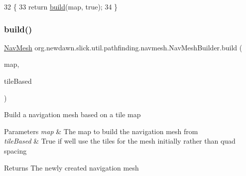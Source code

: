 \begin{DoxyCode}
32                                            \{
33         \textcolor{keywordflow}{return} \mbox{\hyperlink{classorg_1_1newdawn_1_1slick_1_1util_1_1pathfinding_1_1navmesh_1_1_nav_mesh_builder_aea4af5ffd60283ed7c31a98c72da67db}{build}}(map, \textcolor{keyword}{true});
34     \}
\end{DoxyCode}
\mbox{\label{classorg_1_1newdawn_1_1slick_1_1util_1_1pathfinding_1_1navmesh_1_1_nav_mesh_builder_ab75b8b18c341d193ed8ce655dc1d8c90}} 
\subsubsection{\texorpdfstring{build()}{build()}\hspace{0.1cm}{\footnotesize\ttfamily [2/2]}}
{\footnotesize\ttfamily \mbox{\hyperlink{classorg_1_1newdawn_1_1slick_1_1util_1_1pathfinding_1_1navmesh_1_1_nav_mesh}{Nav\+Mesh}} org.\+newdawn.\+slick.\+util.\+pathfinding.\+navmesh.\+Nav\+Mesh\+Builder.\+build (\begin{DoxyParamCaption}\item[{\mbox{\hyperlink{interfaceorg_1_1newdawn_1_1slick_1_1util_1_1pathfinding_1_1_tile_based_map}{Tile\+Based\+Map}}}]{map,  }\item[{boolean}]{tile\+Based }\end{DoxyParamCaption})\hspace{0.3cm}{\ttfamily [inline]}}

Build a navigation mesh based on a tile map


\begin{DoxyParams}{Parameters}
{\em map} & The map to build the navigation mesh from \\
\hline
{\em tile\+Based} & True if we\textquotesingle{}ll use the tiles for the mesh initially rather than quad spacing \\
\hline
\end{DoxyParams}
\begin{DoxyReturn}{Returns}
The newly created navigation mesh 
\end{DoxyReturn}

